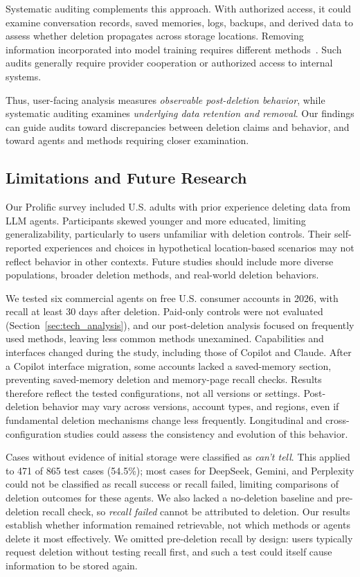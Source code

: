 Systematic auditing complements this approach. With authorized access, it could examine conversation records, saved memories, logs, backups, and derived data to assess whether deletion propagates across storage locations. Removing information incorporated into model training requires different methods~\cite{bourtoule2021machine}. Such audits generally require provider cooperation or authorized access to internal systems.

Thus, user-facing analysis measures \emph{observable post-deletion behavior}, while systematic auditing examines \emph{underlying data retention and removal}.
%
Our findings can guide audits toward discrepancies between deletion claims and behavior, and toward agents and methods requiring closer examination.

\subsection{Limitations and Future Research}

%
Our Prolific survey included U.S. adults with prior experience deleting data from LLM agents.
%
Participants skewed younger and more educated, limiting generalizability, particularly to users unfamiliar with deletion controls.
%
Their self-reported experiences and choices in hypothetical location-based scenarios may not reflect behavior in other contexts.
%
Future studies should include more diverse populations, broader deletion methods, and real-world deletion behaviors.

%
We tested six commercial agents on free U.S. consumer accounts in 2026, with recall at least 30 days after deletion. Paid-only controls were not evaluated (Section~\ref{sec:tech_analysis}), and our post-deletion analysis focused on frequently used methods, leaving less common methods unexamined.
%
Capabilities and interfaces changed during the study, including those of Copilot and Claude. After a Copilot interface migration, some accounts lacked a saved-memory section, preventing saved-memory deletion and memory-page recall checks.
%
Results therefore reflect the tested configurations, not all versions or settings. Post-deletion behavior may vary across versions, account types, and regions, even if fundamental deletion mechanisms change less frequently.
%
Longitudinal and cross-configuration studies could assess the consistency and evolution of this behavior.

%
Cases without evidence of initial storage were classified as \emph{can't tell}.
%
This applied to 471 of 865 test cases (54.5\%); most cases for DeepSeek, Gemini, and Perplexity could not be classified as recall success or recall failed, limiting comparisons of deletion outcomes for these agents.
%
We also lacked a no-deletion baseline and pre-deletion recall check, so \textit{recall failed} cannot be attributed to deletion. Our results establish whether information remained retrievable, not which methods or agents delete it most effectively.
%
We omitted pre-deletion recall by design: users typically request deletion without testing recall first, and such a test could itself cause information to be stored again.
